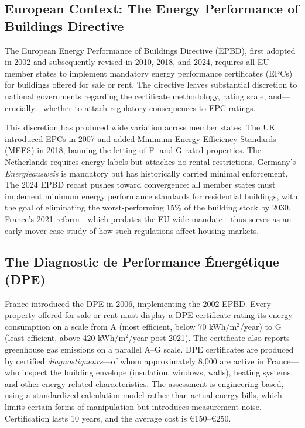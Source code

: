 \documentclass[12pt]{article}
\begin{document}
\subsection{European Context: The Energy Performance of Buildings Directive}

The European Energy Performance of Buildings Directive (EPBD), first adopted in 2002 and subsequently revised in 2010, 2018, and 2024, requires all EU member states to implement mandatory energy performance certificates (EPCs) for buildings offered for sale or rent. The directive leaves substantial discretion to national governments regarding the certificate methodology, rating scale, and---crucially---whether to attach regulatory consequences to EPC ratings.

This discretion has produced wide variation across member states. The UK introduced EPCs in 2007 and added Minimum Energy Efficiency Standards (MEES) in 2018, banning the letting of F- and G-rated properties. The Netherlands requires energy labels but attaches no rental restrictions. Germany's \textit{Energieausweis} is mandatory but has historically carried minimal enforcement. The 2024 EPBD recast \citep{eurostat2023buildings} pushes toward convergence: all member states must implement minimum energy performance standards for residential buildings, with the goal of eliminating the worst-performing 15\% of the building stock by 2030. France's 2021 reform---which predates the EU-wide mandate---thus serves as an early-mover case study of how such regulations affect housing markets.

\subsection{The Diagnostic de Performance \'Energ\'etique (DPE)}

France introduced the DPE in 2006, implementing the 2002 EPBD. Every property offered for sale or rent must display a DPE certificate rating its energy consumption on a scale from A (most efficient, below 70 kWh/m$^2$/year) to G (least efficient, above 420 kWh/m$^2$/year post-2021). The certificate also reports greenhouse gas emissions on a parallel A--G scale. DPE certificates are produced by certified \textit{diagnostiqueurs}---of whom approximately 8,000 are active in France---who inspect the building envelope (insulation, windows, walls), heating systems, and other energy-related characteristics. The assessment is engineering-based, using a standardized calculation model rather than actual energy bills, which limits certain forms of manipulation but introduces measurement noise. Certification lasts 10 years, and the average cost is \euro{}150--\euro{}250.
\end{document}
